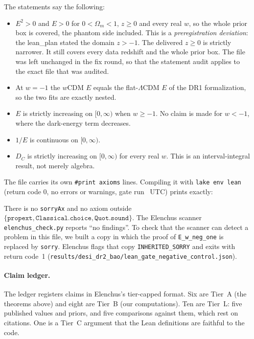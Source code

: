 \documentclass[11pt]{article}
\begin{document}
The statements say the following:
\begin{itemize}
\item $E^2>0$ and $E>0$ for $0<\Omega_m<1$, $z\ge0$ and every real $w$, so
the whole prior box is covered, the phantom side included. This is a
\emph{preregistration deviation}: the lean\_plan stated the domain
$z>-1$. The delivered $z\ge0$ is strictly narrower. It still covers every
data redshift and the whole prior box. The file was left unchanged in the
fix round, so that the statement audit applies to the exact file that was
audited.
\item At $w=-1$ the $w$CDM $E$ equals the flat-$\Lambda$CDM $E$ of the DR1
formalization, so the two fits are exactly nested.
\item $E$ is strictly increasing on $[0,\infty)$ when $w\ge-1$. No claim is
made for $w<-1$, where the dark-energy term decreases.
\item $1/E$ is continuous on $[0,\infty)$.
\item $D_C$ is strictly increasing on $[0,\infty)$ for every real $w$. This
is an interval-integral result, not merely algebra.
\end{itemize}

The file carries its own \texttt{\#print axioms} lines. Compiling it with
\texttt{lake env lean} (return code 0, no errors or warnings, gate run
\LeanStamp~UTC) prints exactly:



\noindent There is no \texttt{sorryAx} and no axiom outside
$\{\texttt{propext},\texttt{Classical.choice},\texttt{Quot.sound}\}$. The
Elenchus scanner \texttt{elenchus\_check.py} reports ``no findings''. To
check that the scanner can detect a problem in this file, we built a copy in
which the proof of \texttt{E\_w\_neg\_one} is replaced by \texttt{sorry}.
Elenchus flags that copy \texttt{INHERITED\_SORRY} and exits with return
code~1 (\texttt{results/desi\_dr2\_bao/lean\_gate\_negative\_control.json}).

\paragraph{Claim ledger.} The ledger registers \LedgerClaims{} claims in
Elenchus's tier-capped format. Six are Tier~A (the theorems above) and
eight are Tier~B (our computations). Ten are Tier~L: five published
values and priors, and five comparisons against them, which rest on
citations. One is a Tier~C argument that the Lean definitions are faithful
to the code.
\end{document}
